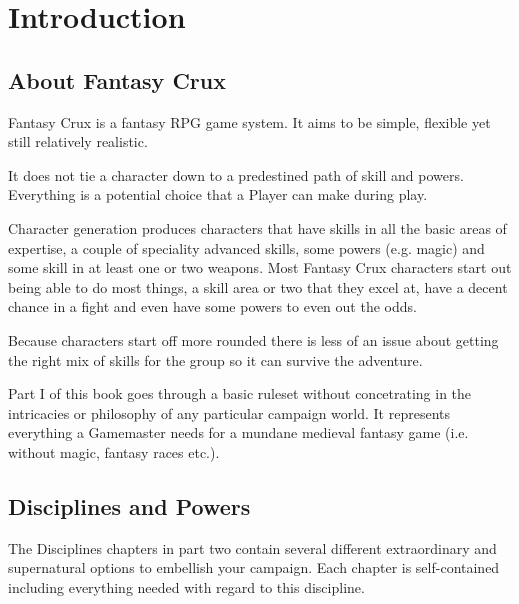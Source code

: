 \chapter{Introduction}
\label{ch:introduction}


\section{About Fantasy Crux}

Fantasy Crux is a fantasy RPG game system. It aims to be simple, flexible yet still relatively realistic. 

It does not tie a character down to a predestined path of skill and powers. Everything is a potential choice that a Player can make during play.

Character generation produces characters that have skills in all the basic areas of expertise, a couple of speciality advanced skills, some powers (e.g. magic) and some skill in at least one or two weapons. Most Fantasy Crux characters start out being able to do most things, a skill area or two that they excel at, have a decent chance in a fight and even have some powers to even out the odds.

Because characters start off more rounded there is less of an issue about getting the right mix of skills for the group so it can survive the adventure.

Part I of this book goes through a basic ruleset without concetrating in the intricacies or philosophy of any particular campaign world. It represents everything a Gamemaster needs for a mundane medieval fantasy game (i.e. without magic, fantasy races etc.). 


\section{Disciplines and Powers}
The Disciplines chapters in part two contain several different extraordinary and supernatural options to embellish your campaign. Each chapter is self-contained including everything needed with regard to this discipline. 

